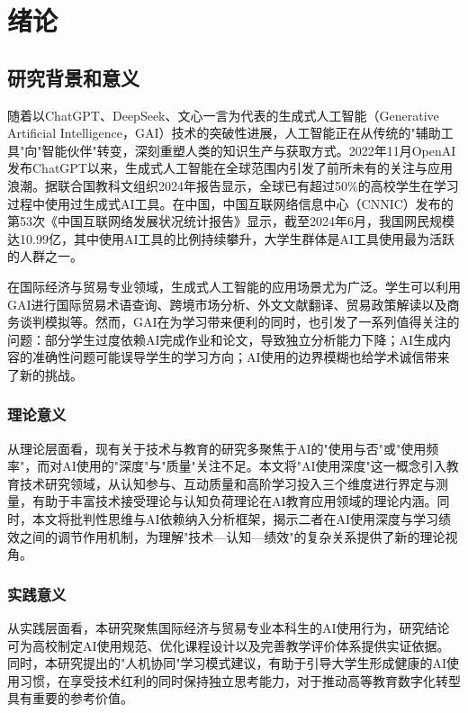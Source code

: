 \documentclass{njtech-thesis}
\begin{document}
\tableofcontents
\newpage

\makebody

\section{绪论}

\subsection{研究背景和意义}

随着以ChatGPT、DeepSeek、文心一言为代表的生成式人工智能（Generative Artificial Intelligence，GAI）技术的突破性进展，人工智能正在从传统的"辅助工具"向"智能伙伴"转变，深刻重塑人类的知识生产与获取方式。2022年11月OpenAI发布ChatGPT以来，生成式人工智能在全球范围内引发了前所未有的关注与应用浪潮。据联合国教科文组织2024年报告显示，全球已有超过50\%的高校学生在学习过程中使用过生成式AI工具。在中国，中国互联网络信息中心（CNNIC）发布的第53次《中国互联网络发展状况统计报告》显示，截至2024年6月，我国网民规模达10.99亿，其中使用AI工具的比例持续攀升，大学生群体是AI工具使用最为活跃的人群之一。

在国际经济与贸易专业领域，生成式人工智能的应用场景尤为广泛。学生可以利用GAI进行国际贸易术语查询、跨境市场分析、外文文献翻译、贸易政策解读以及商务谈判模拟等。然而，GAI在为学习带来便利的同时，也引发了一系列值得关注的问题：部分学生过度依赖AI完成作业和论文，导致独立分析能力下降；AI生成内容的准确性问题可能误导学生的学习方向；AI使用的边界模糊也给学术诚信带来了新的挑战。

\subsubsection{理论意义}

从理论层面看，现有关于技术与教育的研究多聚焦于AI的"使用与否"或"使用频率"，而对AI使用的"深度"与"质量"关注不足。本文将"AI使用深度"这一概念引入教育技术研究领域，从认知参与、互动质量和高阶学习投入三个维度进行界定与测量，有助于丰富技术接受理论与认知负荷理论在AI教育应用领域的理论内涵。同时，本文将批判性思维与AI依赖纳入分析框架，揭示二者在AI使用深度与学习绩效之间的调节作用机制，为理解"技术—认知—绩效"的复杂关系提供了新的理论视角。

\subsubsection{实践意义}

从实践层面看，本研究聚焦国际经济与贸易专业本科生的AI使用行为，研究结论可为高校制定AI使用规范、优化课程设计以及完善教学评价体系提供实证依据。同时，本研究提出的"人机协同"学习模式建议，有助于引导大学生形成健康的AI使用习惯，在享受技术红利的同时保持独立思考能力，对于推动高等教育数字化转型具有重要的参考价值。
\end{document}
